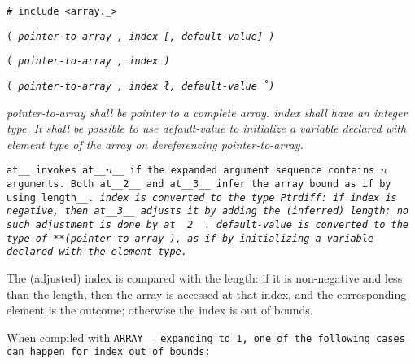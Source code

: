 
\tt{# include <array._>}

\s\s\s\s\tt{(} \it{pointer-to-array} \tt{,}
\it{index}  [\tt{,} \it{default-value}] \tt{)}

\s\tt{(} \it{pointer-to-array} \tt{,}
\it{index} \tt{)}

\s\tt{(} \it{pointer-to-array} \tt{,}
\it{index} \l\tt{,} \it{default-value}\r\ \tt{)}


\it{pointer-to-array} shall be pointer to a complete array.
\it{index} shall have an integer type.
It shall be possible to use \it{default-value} to initialize a variable
declared with element type of the array on dereferencing \it{pointer-to-array}.


\tt{at__} invokes \tt{at__}$n$\_\_ if the
expanded argument sequence contains $n$ arguments.
Both \tt{at__2__} and \tt{at__3__} infer
the array bound as if by using \tt{length__}.
\it{index} is converted to the type \tt{Ptrdiff}:
if \it{index} is negative, then \tt{at__3__} adjusts it by adding
the (inferred) length; no such adjustment is done by \tt{at__2__}.
\it{default-value} is converted to the type of \tt{**(}\it{pointer-to-array}%
\tt{)}, as if by initializing a variable declared with the element type.

The (adjusted) index is compared with the length: if it is non-negative and
less than the length, then the array is accessed at that index, and the
corresponding element is the outcome; otherwise the index is out of bounds.

When compiled with \tt{ARRAY__} expanding to \tt{1},
one of the following cases can happen for index out of bounds:

